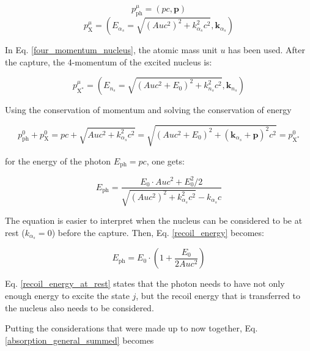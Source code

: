 \documentclass{article}
\begin{document}
\begin{equation}
\label{four_momentum_photon}
	p^\mu_{\mathrm{ph}} = \left( p c, \mathbf{p} \right)
\end{equation}
\begin{equation}
\label{four_momentum_nucleus}
	p^\mu_{\mathrm{X}} = \left( E_{\alpha_s} = \sqrt{ \left(Au c^2\right)^2 + k_{\alpha_s}^2 c^2}, \mathbf{k}_{\alpha_s} \right)
\end{equation}

In Eq. \ref{four_momentum_nucleus}, the atomic mass unit $u$ has been used.
After the capture, the 4-momentum of the excited nucleus is:

\begin{equation}
	\label{four_momentum_excited_nucleus}
	p^\mu_{\mathrm{X^*}} = \left( E_{n_s} = \sqrt{ \left( Au c^2 + E_0 \right)^2 + k_{n_s}^2 c^2}, \mathbf{k}_{n_s} \right)
\end{equation}

Using the conservation of momentum and solving the conservation of energy

\begin{equation}
	\label{conservation_of_energy}
	p^0_\mathrm{ph} + p^0_\mathrm{X} = p c + \sqrt{ Au c^2 + k_{\alpha_s}^2 c^2} = \sqrt{ \left( Au c^2 + E_0 \right)^2 + (\mathbf{k}_{\alpha_s} + \mathbf{p})^2 c^2} = p^0_\mathrm{X^*}
\end{equation}

for the energy of the photon $E_\mathrm{ph} = pc$, one gets:

\begin{equation}
	\label{recoil_energy}
	E_\mathrm{ph} = \frac{E_0 \cdot Auc^2 + E_0^2/2}{\sqrt{\left( Auc^2\right)^2 + k_{\alpha_s}^2 c^2} - k_{\alpha_s}c}
\end{equation}

The equation is easier to interpret when the nucleus can be considered to be at rest ($k_{\alpha_s} = 0$) before the capture. 
Then, Eq. \ref{recoil_energy} becomes:

\begin{equation}
	\label{recoil_energy_at_rest}
	E_\mathrm{ph} = E_0 \cdot \left( 1 + \frac{E_0}{2 Auc^2} \right)
\end{equation}

Eq. \ref{recoil_energy_at_rest} states that the photon needs to have not only enough energy to excite the state $j$, but the recoil energy that is transferred to the nucleus also needs to be considered.

Putting the considerations that were made up to now together, Eq. \ref{absorption_general_summed} becomes
\end{document}
